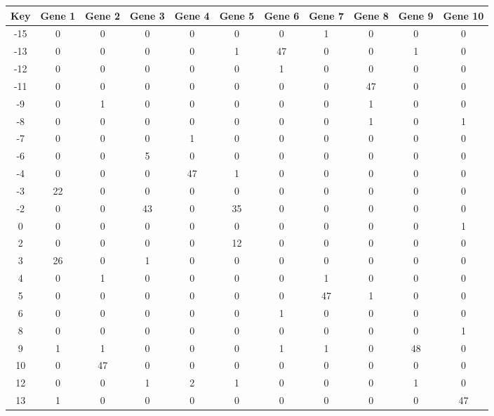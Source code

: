 \begin{tabular}{|c|c|c|c|c|c|c|c|c|c|c|}
\hline
Key & Gene 1 & Gene 2 & Gene 3 & Gene 4 & Gene 5 & Gene 6 & Gene 7 & Gene 8 & Gene 9 & Gene 10 \\
\hline
-15 & 0 & 0 & 0 & 0 & 0 & 0 & 1 & 0 & 0 & 0 \\
-13 & 0 & 0 & 0 & 0 & 1 & 47 & 0 & 0 & 1 & 0 \\
-12 & 0 & 0 & 0 & 0 & 0 & 1 & 0 & 0 & 0 & 0 \\
-11 & 0 & 0 & 0 & 0 & 0 & 0 & 0 & 47 & 0 & 0 \\
-9 & 0 & 1 & 0 & 0 & 0 & 0 & 0 & 1 & 0 & 0 \\
-8 & 0 & 0 & 0 & 0 & 0 & 0 & 0 & 1 & 0 & 1 \\
-7 & 0 & 0 & 0 & 1 & 0 & 0 & 0 & 0 & 0 & 0 \\
-6 & 0 & 0 & 5 & 0 & 0 & 0 & 0 & 0 & 0 & 0 \\
-4 & 0 & 0 & 0 & 47 & 1 & 0 & 0 & 0 & 0 & 0 \\
-3 & 22 & 0 & 0 & 0 & 0 & 0 & 0 & 0 & 0 & 0 \\
-2 & 0 & 0 & 43 & 0 & 35 & 0 & 0 & 0 & 0 & 0 \\
0 & 0 & 0 & 0 & 0 & 0 & 0 & 0 & 0 & 0 & 1 \\
2 & 0 & 0 & 0 & 0 & 12 & 0 & 0 & 0 & 0 & 0 \\
3 & 26 & 0 & 1 & 0 & 0 & 0 & 0 & 0 & 0 & 0 \\
4 & 0 & 1 & 0 & 0 & 0 & 0 & 1 & 0 & 0 & 0 \\
5 & 0 & 0 & 0 & 0 & 0 & 0 & 47 & 1 & 0 & 0 \\
6 & 0 & 0 & 0 & 0 & 0 & 1 & 0 & 0 & 0 & 0 \\
8 & 0 & 0 & 0 & 0 & 0 & 0 & 0 & 0 & 0 & 1 \\
9 & 1 & 1 & 0 & 0 & 0 & 1 & 1 & 0 & 48 & 0 \\
10 & 0 & 47 & 0 & 0 & 0 & 0 & 0 & 0 & 0 & 0 \\
12 & 0 & 0 & 1 & 2 & 1 & 0 & 0 & 0 & 1 & 0 \\
13 & 1 & 0 & 0 & 0 & 0 & 0 & 0 & 0 & 0 & 47 \\
\hline
\end{tabular}